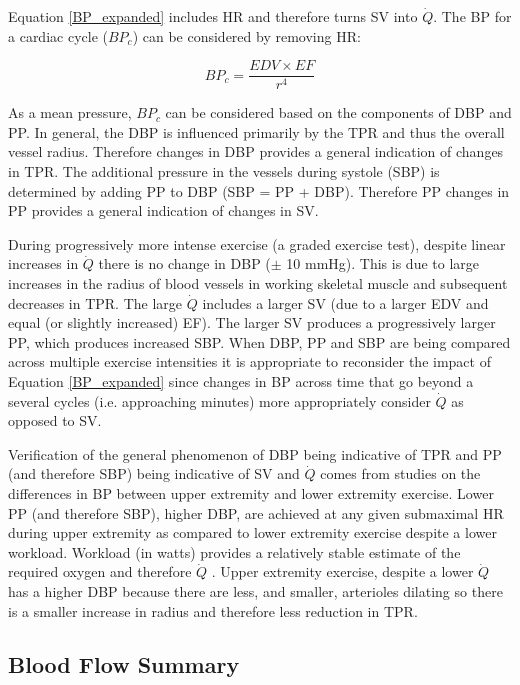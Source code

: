 Equation \ref{BP_expanded} includes HR and therefore turns SV into $\dot{Q}$. The BP for a cardiac cycle ($BP_c$) can be considered by removing HR:

\begin{equation}
    BP_c = \frac{EDV \times EF}{r^4} 
    \label{BP_cycle}
\end{equation}

As a mean pressure, $BP_c$ can be considered based on the components of DBP and PP. In general, the DBP is influenced primarily by the TPR and thus the overall vessel radius. Therefore changes in DBP provides a general indication of changes in TPR. The additional pressure in the vessels during systole (SBP) is determined by adding PP to DBP (SBP = PP + DBP). Therefore PP changes in PP provides a general indication of changes in SV.

During progressively more intense exercise (a graded exercise test), despite linear increases in $\dot{Q}$ there is no change in DBP ($\pm$ 10 mmHg). This is due to large increases in the radius of blood vessels in working skeletal muscle and subsequent decreases in TPR. The large $\dot{Q}$ includes a larger SV (due to a larger EDV and equal (or slightly increased) EF). The larger SV produces a progressively larger PP, which produces increased SBP. When DBP, PP and SBP are being compared across multiple exercise intensities it is appropriate to reconsider the impact of Equation \ref{BP_expanded} since changes in BP across time that go beyond a several cycles (i.e. approaching minutes) more appropriately consider $\dot{Q}$ as opposed to SV.

Verification of the general phenomenon of DBP being indicative of TPR and PP (and therefore SBP) being indicative of SV and $\dot{Q}$ comes from studies on the differences in BP between upper extremity and lower extremity exercise. Lower PP (and therefore SBP), higher DBP, are achieved at any given submaximal HR during upper extremity as compared to lower extremity exercise despite a lower workload. Workload (in watts) provides a relatively stable estimate of the required oxygen and therefore $\dot{Q}$ \cite{dias_differences_2022}. Upper extremity exercise, despite a lower $\dot{Q}$ has a higher DBP because there are less, and smaller, arterioles dilating so there is a smaller increase in radius and therefore less reduction in TPR.

\subsection{Blood Flow Summary}

